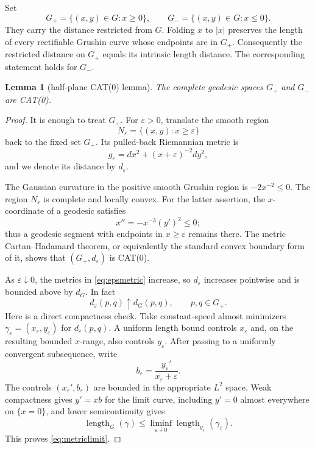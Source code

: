 \documentclass[11pt]{article}
\newtheorem{lemma}[theorem]{Lemma}
\newcommand{\len}{\operatorname{length}}
\begin{document}
Set
\[
 G_+=\{(x,y)\in G:x\ge0\},\qquad
 G_-=\{(x,y)\in G:x\le0\}.
\]
They carry the distance restricted from $G$.  Folding $x$ to $|x|$ preserves
the length of every rectifiable Grushin curve whose endpoints are in $G_+$.
Consequently the restricted distance on $G_+$ equals its intrinsic length
distance.  The corresponding statement holds for $G_-$.

\begin{lemma}[half-plane CAT(0) lemma]\label{lem:cat-half}
The complete geodesic spaces $G_+$ and $G_-$ are CAT(0).
\end{lemma}

\begin{proof}
It is enough to treat $G_+$.  For $\varepsilon>0$, translate the smooth
region
\[
 N_\varepsilon=\{(x,y):x\ge\varepsilon\}
\]
back to the fixed set $G_+$.  Its pulled-back Riemannian metric is
\begin{equation}\label{eq:epsmetric}
 g_\varepsilon=dx^2+(x+\varepsilon)^{-2}dy^2,
\end{equation}
and we denote its distance by $d_\varepsilon$.

The Gaussian curvature in the positive smooth Grushin region is
$-2x^{-2}\le0$.  The region $N_\varepsilon$ is complete and locally convex.
For the latter assertion, the $x$-coordinate of a geodesic satisfies
\[
 x''=-x^{-3}(y')^2\le0;
\]
thus a geodesic segment with endpoints in $x\ge\varepsilon$ remains there.
The metric Cartan--Hadamard theorem, or equivalently the standard convex
boundary form of it, shows that $(G_+,d_\varepsilon)$ is CAT(0).

As $\varepsilon\downarrow0$, the metrics in \eqref{eq:epsmetric} increase,
so $d_\varepsilon$ increases pointwise and is bounded above by $d_G$.
In fact
\begin{equation}\label{eq:metriclimit}
 d_\varepsilon(p,q)\uparrow d_G(p,q),\qquad p,q\in G_+.
\end{equation}
Here is a direct compactness check.  Take constant-speed almost minimizers
$\gamma_\varepsilon=(x_\varepsilon,y_\varepsilon)$ for
$d_\varepsilon(p,q)$.  A uniform length bound controls $x_\varepsilon$ and,
on the resulting bounded $x$-range, also controls $y_\varepsilon$.  After
passing to a uniformly convergent subsequence, write
\[
 b_\varepsilon=\frac{y_\varepsilon'}{x_\varepsilon+\varepsilon}.
\]
The controls $(x_\varepsilon',b_\varepsilon)$ are bounded in the appropriate
$L^2$ space.  Weak compactness gives $y'=xb$ for the limit curve, including
$y'=0$ almost everywhere on $\{x=0\}$, and lower semicontinuity gives
\[
 \len_G(\gamma)\le
 \liminf_{\varepsilon\downarrow0}\len_{g_\varepsilon}
 (\gamma_\varepsilon).
\]
This proves \eqref{eq:metriclimit}.


\end{proof}
\end{document}
